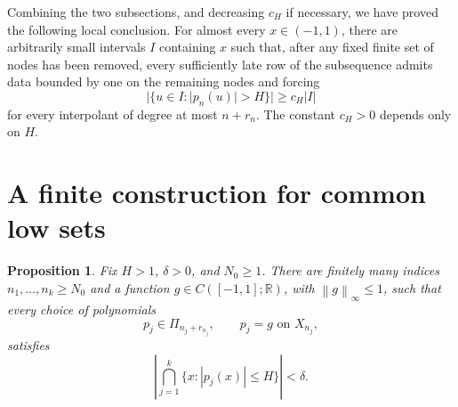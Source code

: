 \documentclass[11pt]{article}
\newtheorem{proposition}[theorem]{Proposition}
\theoremstyle{definition}
\numberwithin{equation}{section}
\newcommand{\R}{\mathbb R}
\newcommand{\norm}[1]{\left\lVert #1\right\rVert}
\begin{document}
Combining the two subsections, and decreasing \(c_H\) if necessary,
we have proved the following local conclusion. For almost every
\(x\in(-1,1)\), there are arbitrarily small intervals \(I\) containing
\(x\) such that, after any fixed finite set of nodes has been removed,
every sufficiently late row of the subsequence admits data bounded
by one on the remaining nodes and forcing
\[
 |\{u\in I:|p_n(u)|>H\}|\ge c_H|I|
\]
for every interpolant of degree at most \(n+r_n\).
The constant \(c_H>0\) depends only on \(H\).

\section{A finite construction for common low sets}
\label{sec:finite}

\begin{proposition}\label{prop:finite}
Fix \(H>1\), \(\delta>0\), and \(N_0\ge1\).
There are finitely many indices \(n_1,\ldots,n_k\ge N_0\) and
a function \(g\in C([-1,1];\R)\), with \(\norm{g}_\infty\le1\),
such that every choice of polynomials
\[
 p_j\in\Pi_{n_j+r_{n_j}},\qquad p_j=g\text{ on }X_{n_j},
\]
satisfies
\begin{equation}\label{eq:finite-low-set}
 \left|\bigcap_{j=1}^k\{x:|p_j(x)|\le H\}\right|<\delta.
\end{equation}
\end{proposition}
\end{document}
